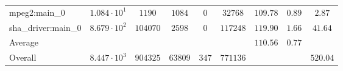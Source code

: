 \begin{tabular}{|l|c|c|c|c|c|c|c|c|}
mpeg2:main\_0           & $ 1.084 \cdot 10^{1} $ & $ 1190   $ & $ 1084  $ & $ 0   $ & $ 32768  $ & $ 109.78      $ & $ 0.89    $ & $ 2.87    $ \\
sha\_driver:main\_0     & $ 8.679 \cdot 10^{2} $ & $ 104070 $ & $ 2598  $ & $ 0   $ & $ 117248 $ & $ 119.90      $ & $ 1.66    $ & $ 41.64   $ \\
\hline
Average                 & $                    $ & $        $ & $       $ & $     $ & $        $ & $ 110.56      $ & $ 0.77    $ & $         $ \\
\hline
Overall                 & $ 8.447 \cdot 10^{3} $ & $ 904325 $ & $ 63809 $ & $ 347 $ & $ 771136 $ & $             $ & $         $ & $ 520.04  $ \\
\hline
\end{tabular}
